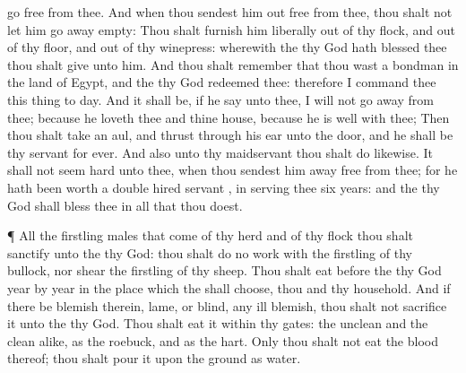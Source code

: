 {go
free from thee.
And when thou
sendest him out
free from thee, thou shalt not let him go
away
empty:
Thou shalt
furnish him
liberally out of thy
flock, and out of thy
floor, and out of thy
winepress:
{} wherewith the
{} thy
God hath
blessed thee thou shalt
give unto him.
And thou shalt
remember that thou wast a
bondman in the
land of
Egypt, and the
{} thy
God
redeemed thee: therefore I
command thee this
thing to
day.
And it shall be, if he
say unto thee, I will not go
away from thee; because he
loveth thee and thine
house, because he is
well with thee;
Then thou shalt
take an
aul, and
thrust
{} through his
ear unto the
door, and he shall be thy
servant for
ever. And also unto thy
maidservant thou shalt
do likewise.
It shall not seem
hard unto
thee, when thou sendest him
away
free from thee; for he hath been
worth a
double hired
servant
{}, in
serving thee
six
years: and the
{} thy
God shall
bless thee in all that thou
doest.
\par }{\PP {}¶ All the
firstling
males that
come of thy
herd and of thy
flock thou shalt
sanctify unto the
{} thy
God: thou shalt do no
work with the
firstling of thy
bullock, nor
shear the
firstling of thy
sheep.
Thou shalt
eat
{}
before the
{} thy
God
year by
year in the
place which the
{} shall
choose, thou and thy
household.
And if there be
{}
blemish therein,
{}
lame, or
blind,
{} any
ill
blemish, thou shalt not
sacrifice it unto the
{} thy
God.
Thou shalt
eat it within thy
gates: the
unclean and the
clean
{}
alike, as the
roebuck, and as the
hart.
Only thou shalt not
eat the
blood thereof; thou shalt
pour it upon the
ground as
water.

}
